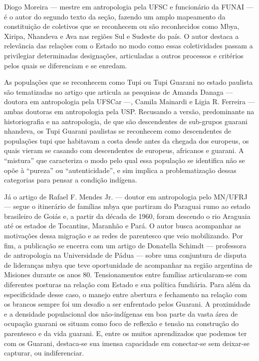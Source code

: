 Diogo Moreira — mestre em antropologia pela UFSC e funcionário da FUNAI
— é o autor do segundo texto da seção, fazendo um amplo mapeamento da
constituição de coletivos que se reconhecem ou são reconhecidos como
Mbya, Xiripa, Nhandeva e Ava nas regiões Sul e Sudeste do país. O autor
destaca a relevância das relações com o Estado no modo como essas
coletividades passam a privilegiar determinadas designações,
articuladas a outros processos e critérios pelos quais se diferenciam e
se enredam. 

As populações que se reconhecem como Tupi ou Tupi Guarani no estado
paulista são tematizadas no artigo que articula as pesquisas de Amanda
Danaga — doutora em antropologia pela UFSCar —, Camila Mainardi e Ligia
R. Ferreira — ambas doutoras em antropologia pela USP. Recusando a
versão, predominante na historiografia e na antropologia, de que são
descendentes de sub-grupos guarani nhandeva, os Tupi Guarani paulistas
se reconhecem como descendentes de populações tupi que habitavam a
costa desde antes da chegada dos europeus, os quais vieram se casando
com descendentes de europeus, africanos e guarani. A ``mistura'' que
caracteriza o modo pelo qual essa população se identifica não se opõe à
``pureza'' ou ``autenticidade'', e sim implica a problematização dessas
categorias para pensar a condição indígena. 

Já o artigo de Rafael F. Mendes Jr. — doutor em antropologia pelo
MN/UFRJ — segue o itinerário de famílias mbya que partiram do Paraguai
rumo ao estado brasileiro de Goiás e, a partir da década de 1960, foram
descendo o rio Araguaia até os estados de Tocantins, Maranhão e Pará. O
autor busca acompanhar as motivações dessa migração e as redes de
parentesco que veio mobilizando. Por fim, a publicação se encerra com
um artigo de Donatella Schimdt — professora de antropologia na
Universidade de Pádua — sobre uma conjuntura de disputa de lideranças
mbya que teve oportunidade de acompanhar na região argentina de
Misiones durante os anos 80. Tensionamentos entre famílias
articularam-se com diferentes posturas na relação com Estado e sua
política fundiária. Para além da especificidade desse caso, o manejo
entre abertura e fechamento na relação com os brancos sempre foi um
desafio a ser enfrentado pelos Guarani. A proximidade e a densidade
populacional dos não-indígenas em boa parte da vasta área de ocupação
guarani os situam como foco de reflexão e tensão na construção do
parentesco e da vida guarani. E, entre os muitos aprendizados que
podemos ter com os Guarani, destaca-se sua imensa capacidade em
conectar-se sem deixar-se capturar, ou indiferenciar.


